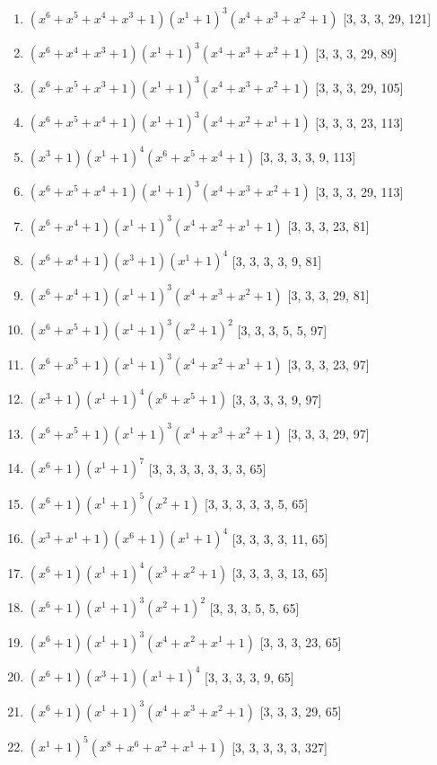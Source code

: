 \documentclass[10pt,twocolumn]{article}
\begin{document}
\begin{enumerate}
\item $(x^{6} + x^{5} + x^{4} + x^{3} + 1)(x^{1} + 1)^{3}(x^{4} + x^{3} + x^{2} + 1)$  [3, 3, 3, 29, 121]
\item $(x^{6} + x^{4} + x^{3} + 1)(x^{1} + 1)^{3}(x^{4} + x^{3} + x^{2} + 1)$  [3, 3, 3, 29, 89]
\item $(x^{6} + x^{5} + x^{3} + 1)(x^{1} + 1)^{3}(x^{4} + x^{3} + x^{2} + 1)$  [3, 3, 3, 29, 105]
\item $(x^{6} + x^{5} + x^{4} + 1)(x^{1} + 1)^{3}(x^{4} + x^{2} + x^{1} + 1)$  [3, 3, 3, 23, 113]
\item $(x^{3} + 1)(x^{1} + 1)^{4}(x^{6} + x^{5} + x^{4} + 1)$  [3, 3, 3, 3, 9, 113]
\item $(x^{6} + x^{5} + x^{4} + 1)(x^{1} + 1)^{3}(x^{4} + x^{3} + x^{2} + 1)$  [3, 3, 3, 29, 113]
\item $(x^{6} + x^{4} + 1)(x^{1} + 1)^{3}(x^{4} + x^{2} + x^{1} + 1)$  [3, 3, 3, 23, 81]
\item $(x^{6} + x^{4} + 1)(x^{3} + 1)(x^{1} + 1)^{4}$  [3, 3, 3, 3, 9, 81]
\item $(x^{6} + x^{4} + 1)(x^{1} + 1)^{3}(x^{4} + x^{3} + x^{2} + 1)$  [3, 3, 3, 29, 81]
\item $(x^{6} + x^{5} + 1)(x^{1} + 1)^{3}(x^{2} + 1)^{2}$  [3, 3, 3, 5, 5, 97]
\item $(x^{6} + x^{5} + 1)(x^{1} + 1)^{3}(x^{4} + x^{2} + x^{1} + 1)$  [3, 3, 3, 23, 97]
\item $(x^{3} + 1)(x^{1} + 1)^{4}(x^{6} + x^{5} + 1)$  [3, 3, 3, 3, 9, 97]
\item $(x^{6} + x^{5} + 1)(x^{1} + 1)^{3}(x^{4} + x^{3} + x^{2} + 1)$  [3, 3, 3, 29, 97]
\item $(x^{6} + 1)(x^{1} + 1)^{7}$  [3, 3, 3, 3, 3, 3, 3, 65]
\item $(x^{6} + 1)(x^{1} + 1)^{5}(x^{2} + 1)$  [3, 3, 3, 3, 3, 5, 65]
\item $(x^{3} + x^{1} + 1)(x^{6} + 1)(x^{1} + 1)^{4}$  [3, 3, 3, 3, 11, 65]
\item $(x^{6} + 1)(x^{1} + 1)^{4}(x^{3} + x^{2} + 1)$  [3, 3, 3, 3, 13, 65]
\item $(x^{6} + 1)(x^{1} + 1)^{3}(x^{2} + 1)^{2}$  [3, 3, 3, 5, 5, 65]
\item $(x^{6} + 1)(x^{1} + 1)^{3}(x^{4} + x^{2} + x^{1} + 1)$  [3, 3, 3, 23, 65]
\item $(x^{6} + 1)(x^{3} + 1)(x^{1} + 1)^{4}$  [3, 3, 3, 3, 9, 65]
\item $(x^{6} + 1)(x^{1} + 1)^{3}(x^{4} + x^{3} + x^{2} + 1)$  [3, 3, 3, 29, 65]
\item $(x^{1} + 1)^{5}(x^{8} + x^{6} + x^{2} + x^{1} + 1)$  [3, 3, 3, 3, 3, 327]

\end{enumerate}
\end{document}
